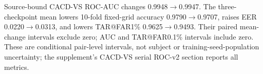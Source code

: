 Source-bound CACD-VS ROC-AUC changes 0.9948$\to$0.9947. The three-checkpoint mean lowers 10-fold fixed-grid accuracy 0.9790$\to$0.9707, raises EER 0.0220$\to$0.0313, and lowers TAR@FAR1\% 0.9625$\to$0.9493. Their paired mean-change intervals exclude zero; AUC and TAR@FAR0.1\% intervals include zero. These are conditional pair-level intervals, not subject or training-seed-population uncertainty; the supplement's CACD-VS serial ROC-v2 section reports all metrics.
